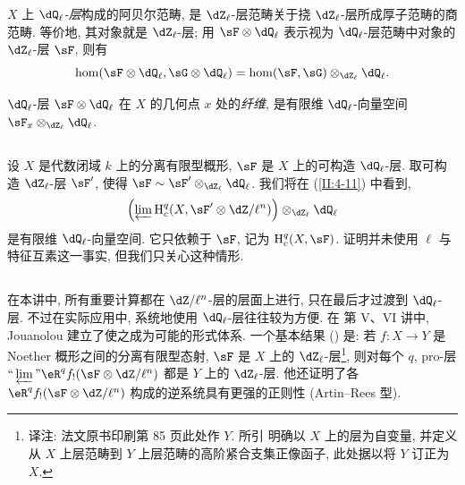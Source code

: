 $X$ 上 \emph{$\dQ_\ell$-层}构成的阿贝尔范畴, 是 $\dZ_\ell$-层范畴关于挠 $\dZ_\ell$-层所成厚子范畴的商范畴.
等价地, 其对象就是 $\dZ_\ell$-层; 用 $\sF\otimes\dQ_\ell$ 表示视为 $\dQ_\ell$-层范畴中对象的 $\dZ_\ell$-层 $\sF$, 则有
\[
  \hom(\sF\otimes\dQ_\ell,\sG\otimes\dQ_\ell) = \hom(\sF,\sG)\otimes_{\dZ_\ell}\dQ_\ell \text{.}
\]

$\dQ_\ell$-层 $\sF\otimes\dQ_\ell$ 在 $X$ 的几何点 $x$ 处的\emph{纤维}, 是有限维 $\dQ_\ell$-向量空间 $\sF_x\otimes_{\dZ_\ell}\dQ_\ell$.

\subsection{}\label{II:2-10}

设 $X$ 是代数闭域 $k$ 上的分离有限型概形, $\sF$ 是 $X$ 上的可构造 $\dQ_\ell$-层. 取可构造 $\dZ_\ell$-层 $\sF'$, 使得 $\sF\sim \sF'\otimes_{\dZ_\ell}\dQ_\ell$. 我们将在 (\ref{II:4-11}) 中看到,
\[
  \left(\varprojlim \h_c^q(X,\sF'\otimes \dZ/\ell^n)\right)\otimes_{\dZ_\ell}\dQ_\ell
\]
是有限维 $\dQ_\ell$-向量空间. 它只依赖于 $\sF$, 记为 $\h_c^q(X,\sF)$. 证明并未使用 $\ell$ 与特征互素这一事实, 但我们只关心这种情形.

\subsection{}\label{II:2-11}

在本讲中, 所有重要计算都在 $\dZ/\ell^n$-层的层面上进行, 只在最后才过渡到 $\dQ_\ell$-层. 不过在实际应用中, 系统地使用 $\dQ_\ell$-层往往较为方便. 在 \cite{sga5} 第 V、VI 讲中, Jouanolou 建立了使之成为可能的形式体系. 一个基本结果 (\cite[VI 2.2]{sga5}) 是: 若 $f:X\to Y$ 是 Noether 概形之间的分离有限型态射, $\sF$ 是 $X$ 上的 $\dZ_\ell$-层\footnote{译注: 法文原书印刷第 85 页此处作 $Y$. 所引 \cite[VI 2.2.2--2.2.3, 第 274--275 页]{sga5} 明确以 $X$ 上的层为自变量, 并定义从 $X$ 上层范畴到 $Y$ 上层范畴的高阶紧合支集正像函子, 此处据以将 $Y$ 订正为 $X$.}, 则对每个 $q$, pro-层 $\text{``}\varprojlim\text{''}\eR^q f_! (\sF\otimes\dZ/\ell^n)$ 都是 $Y$ 上的 $\dZ_\ell$-层. 他还证明了各 $\eR^q f_!(\sF\otimes\dZ/\ell^n)$ 构成的逆系统具有更强的正则性 (Artin--Rees 型).

